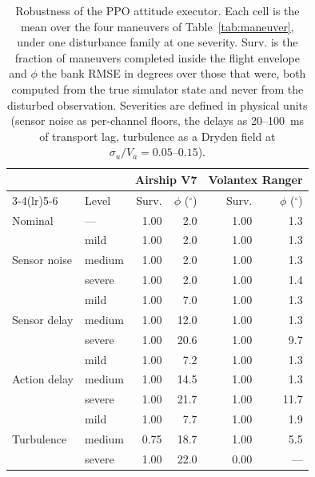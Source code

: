 \begin{table}[t]
\caption{Robustness of the PPO attitude executor. Each cell is the mean over the four maneuvers of Table~\ref{tab:maneuver}, under one disturbance family at one severity. Surv. is the fraction of maneuvers completed inside the flight envelope and $\phi$ the bank RMSE in degrees over those that were, both computed from the true simulator state and never from the disturbed observation. Severities are defined in physical units (sensor noise as per-channel floors, the delays as 20--100~ms of transport lag, turbulence as a Dryden field at $\sigma_u/V_a = 0.05$--$0.15$).}
\label{tab:robustness}
\centering
\setlength{\tabcolsep}{3pt}
\begin{tabular}{llrrrr}
\toprule
& & \multicolumn{2}{c}{Airship V7} & \multicolumn{2}{c}{Volantex Ranger} \\
\cmidrule(lr){3-4}\cmidrule(lr){5-6}
& Level & Surv. & $\phi$ ($^\circ$) & Surv. & $\phi$ ($^\circ$) \\
\midrule
Nominal & --- & 1.00 & 2.0 & 1.00 & 1.3 \\
\midrule
\multirow{3}{*}{Sensor noise} & mild & 1.00 & 2.0 & 1.00 & 1.3 \\
 & medium & 1.00 & 2.0 & 1.00 & 1.3 \\
 & severe & 1.00 & 2.0 & 1.00 & 1.4 \\
\midrule
\multirow{3}{*}{Sensor delay} & mild & 1.00 & 7.0 & 1.00 & 1.3 \\
 & medium & 1.00 & 12.0 & 1.00 & 1.3 \\
 & severe & 1.00 & 20.6 & 1.00 & 9.7 \\
\midrule
\multirow{3}{*}{Action delay} & mild & 1.00 & 7.2 & 1.00 & 1.3 \\
 & medium & 1.00 & 14.5 & 1.00 & 1.3 \\
 & severe & 1.00 & 21.7 & 1.00 & 11.7 \\
\midrule
\multirow{3}{*}{Turbulence} & mild & 1.00 & 7.7 & 1.00 & 1.9 \\
 & medium & 0.75 & 18.7 & 1.00 & 5.5 \\
 & severe & 1.00 & 22.0 & 0.00 & --- \\
\bottomrule
\end{tabular}
\end{table}
